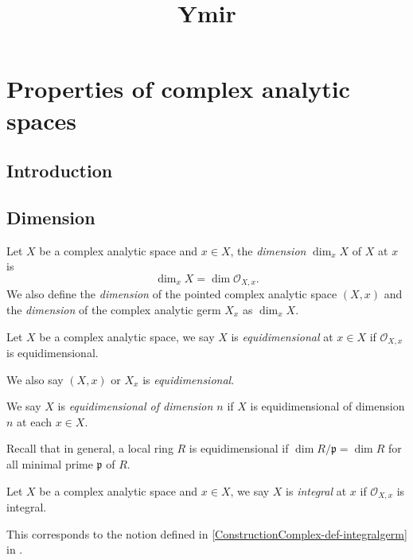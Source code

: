 
\title{Ymir}

\maketitle
\tableofcontents

\chapter*{Properties of complex analytic spaces}\label{chap-propcomplex}

\section{Introduction}\label{sec-introduction-propertycomplex}


\section{Dimension}

\begin{definition}
    Let $X$ be a complex analytic space and $x\in X$, the \emph{dimension} $\dim_x X$ of $X$ at $x$ is 
    \[
        \dim_x X=\dim \mathcal{O}_{X,x}.
    \]
    We also define the \emph{dimension} of the pointed complex analytic space $(X,x)$ and the \emph{dimension} of the complex analytic germ $X_x$ as $\dim_x X$.
\end{definition}

\begin{definition}
    Let $X$ be a complex analytic space, we say $X$ is \emph{equidimensional} at $x\in X$ if $\mathcal{O}_{X,x}$ is equidimensional.

    We also say $(X,x)$ or $X_x$ is \emph{equidimensional}.

    We say $X$ is \emph{equidimensional of dimension $n$} if $X$ is equidimensional of dimension $n$ at each $x\in X$.
\end{definition}
Recall that in general, a local ring $R$ is equidimensional if $\dim R/\mathfrak{p}=\dim R$ for all minimal prime $\mathfrak{p}$ of $R$.

\begin{definition}
    Let $X$ be a complex analytic space and $x\in X$, we say $X$ is \emph{integral} at $x$ if $\mathcal{O}_{X,x}$ is integral.
\end{definition}
This corresponds to the notion defined in \cref{ConstructionComplex-def-integralgerm} in .

